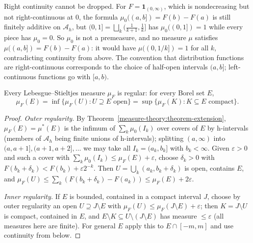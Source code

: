 \begin{counterexample}\label{measure-theory:counterexample-right-continuity}
Right continuity cannot be dropped. For $F = \mathbf{1}_{(0, \infty)}$, which is nondecreasing but not right-continuous at $0$, the formula $\mu_0((a, b]) = F(b) - F(a)$ is still finitely additive on
$\mathcal{A}_h$, but $(0, 1] = \bigsqcup_k(\frac1{k+1}, \frac1k]$ has $\mu_0((0, 1]) = 1$ while every piece has $\mu_0 = 0$. So $\mu_0$ is not a premeasure, and no measure $\mu$ satisfies
$\mu((a, b]) = F(b) - F(a)$: it would have $\mu((0, 1/k]) = 1$ for all $k$, contradicting continuity from above. The convention that distribution functions are right-continuous corresponds to the choice
of half-open intervals $(a, b]$; left-continuous functions go with $[a, b)$.
\end{counterexample}

\begin{proposition}\label{measure-theory:proposition-stieltjes-regular}
Every Lebesgue--Stieltjes measure $\mu_F$ is regular: for every Borel set $E$,
\[
\mu_F(E) = \inf\{\mu_F(U) : U \supseteq E \text{ open}\} = \sup\{\mu_F(K) : K \subseteq E \text{ compact}\}.
\]
\end{proposition}

\begin{proof}
\emph{Outer regularity.} By Theorem~\ref{measure-theory:theorem-extension}, $\mu_F(E) = \mu^*(E)$ is the infimum of $\sum_k\mu_0(I_k)$ over covers of $E$ by h-intervals (members of
$\mathcal{A}_h$ being finite unions of h-intervals); splitting $(a, \infty)$ into $(a, a + 1], (a + 1, a + 2], \ldots$ we may take all $I_k = (a_k, b_k]$ with $b_k < \infty$. Given $\varepsilon > 0$ and
such a cover with $\sum_k\mu_0(I_k) \leq \mu_F(E) + \varepsilon$, choose $\delta_k > 0$ with $F(b_k + \delta_k) < F(b_k) + \varepsilon2^{-k}$. Then $U = \bigcup_k(a_k, b_k + \delta_k)$ is open, contains $E$, and
$\mu_F(U) \leq \sum_k(F(b_k + \delta_k) - F(a_k)) \leq \mu_F(E) + 2\varepsilon$.

\emph{Inner regularity.} If $E$ is bounded, contained in a compact interval $J$, choose by outer regularity an open $U \supseteq J \setminus E$ with $\mu_F(U) \leq \mu_F(J \setminus E) + \varepsilon$; then
$K = J \setminus U$ is compact, contained in $E$, and $E \setminus K \subseteq U \setminus (J \setminus E)$ has measure $\leq \varepsilon$ (all measures here are finite). For general $E$ apply this to
$E \cap [-m, m]$ and use continuity from below.
\end{proof}

